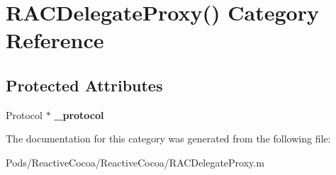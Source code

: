 \hypertarget{category_r_a_c_delegate_proxy_07_08}{}\section{R\+A\+C\+Delegate\+Proxy() Category Reference}
\label{category_r_a_c_delegate_proxy_07_08}
\subsection*{Protected Attributes}
\begin{DoxyCompactItemize}
\item 
\mbox{\label{category_r_a_c_delegate_proxy_07_08_a79c4be753cebdba6f9bebba658d18e20}} 
Protocol $\ast$ {\bfseries \+\_\+protocol}
\end{DoxyCompactItemize}


The documentation for this category was generated from the following file\+:\begin{DoxyCompactItemize}
\item 
Pods/\+Reactive\+Cocoa/\+Reactive\+Cocoa/R\+A\+C\+Delegate\+Proxy.\+m\end{DoxyCompactItemize}
